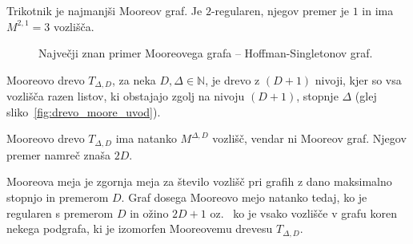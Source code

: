 \documentclass[fin1, tisk]{fmfdelo}
\begin{document}
\begin{zgled}
    Trikotnik je najmanjši Mooreov graf. Je $2$-regularen, njegov premer je $1$ in ima $M^{2, 1} = 3$ vozlišča.
\end{zgled}

\begin{figure}[ht]
    \centering
    \def\svgwidth{\columnwidth}
    \caption{Največji znan primer Mooreovega grafa -- Hoffman-Singletonov graf.}
\end{figure}

\begin{definicija}\label{def:moore_drevo}
    Mooreovo drevo $T_{\Delta, D}$, za neka $D, \Delta \in \mathbb{N}$, 
    je drevo z $(D+1)$ nivoji, kjer so vsa vozlišča razen listov, ki obstajajo zgolj na nivoju $(D+1)$, 
    stopnje $\Delta$ (glej sliko~\ref{fig:drevo_moore_uvod}).
\end{definicija}

\begin{opomba}
    Mooreovo drevo $T_{\Delta, D}$ ima natanko $M^{\Delta, D}$ vozlišč, vendar ni Mooreov graf. Njegov premer namreč znaša $2D$.
\end{opomba}

\begin{trditev}\label{tr:moore_bound}
    Mooreova meja je zgornja meja za število vozlišč pri grafih z dano maksimalno stopnjo in premerom $D$.
    Graf dosega Mooreovo mejo natanko tedaj, ko je regularen s premerom $D$ in ožino $2D+1$ oz.~%
    ko je vsako vozlišče v grafu koren nekega podgrafa, ki je izomorfen Mooreovemu drevesu $T_{\Delta, D}$.
\end{trditev}
\end{document}
